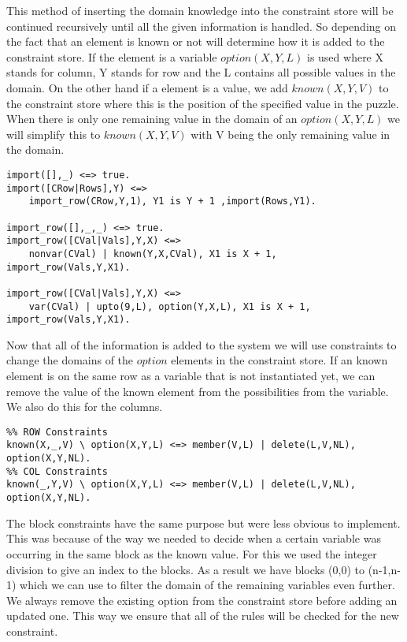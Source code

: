This method of inserting the domain knowledge into the constraint store will be continued recursively until all the given information is handled.
So depending on the fact that an element is known or not will determine how it is added to the constraint store.
If the element is a variable \textsl{$option(X,Y,L)$} is used where X stands for column, Y stands for row and the L contains all possible values in the domain.
On the other hand if a element is a value, we add \textsl{$known(X,Y,V)$} to the constraint store where this is the position of the specified value in the puzzle.
When there is only one remaining value in the domain of an \textsl{$option(X,Y,L)$} we will simplify this to \textsl{$known(X,Y,V)$} with V being the only remaining value in the domain.

\begin{lstlisting}
import([],_) <=> true.
import([CRow|Rows],Y) <=>
    import_row(CRow,Y,1), Y1 is Y + 1 ,import(Rows,Y1).

import_row([],_,_) <=> true.
import_row([CVal|Vals],Y,X) <=>
    nonvar(CVal) | known(Y,X,CVal), X1 is X + 1, import_row(Vals,Y,X1).

import_row([CVal|Vals],Y,X) <=>
    var(CVal) | upto(9,L), option(Y,X,L), X1 is X + 1, import_row(Vals,Y,X1).
\end{lstlisting}

Now that all of the information is added to the system we will use constraints to change the domains of the \textsl{$option$} elements in the constraint store.
If an known element is on the same row as a variable that is not instantiated yet, we can remove the value of the known element from the possibilities from the variable.
We also do this for the columns.

\begin{lstlisting}
%% ROW Constraints
known(X,_,V) \ option(X,Y,L) <=> member(V,L) | delete(L,V,NL), option(X,Y,NL).
%% COL Constraints
known(_,Y,V) \ option(X,Y,L) <=> member(V,L) | delete(L,V,NL), option(X,Y,NL).
\end{lstlisting}

The block constraints have the same purpose but were less obvious to implement. 
This was because of the way we needed to decide when a certain variable was occurring in the same block as the known value.
For this we used the integer division to give an index to the blocks.
As a result we have blocks (0,0) to (n-1,n-1) which we can use to filter the domain of the remaining variables even further.
We always remove the existing option from the constraint store before adding an updated one.
This way we ensure that all of the rules will be checked for the new constraint.

